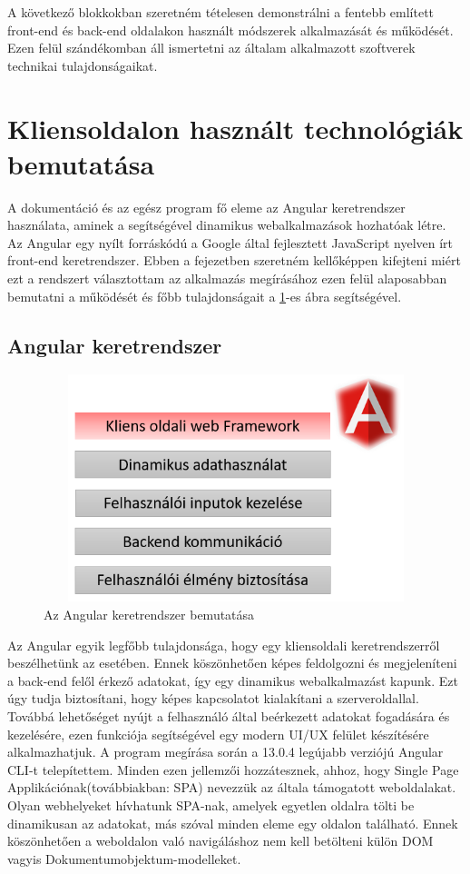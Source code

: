 \bigskip
A következő blokkokban szeretném tételesen demonstrálni a fentebb említett front-end és back-end oldalakon használt módszerek alkalmazását és működését. Ezen felül szándékomban áll ismertetni az általam alkalmazott szoftverek technikai tulajdonságaikat.

\section{Kliensoldalon használt technológiák bemutatása}
A dokumentáció és az egész program fő eleme az Angular keretrendszer használata, aminek a segítségével dinamikus webalkalmazások hozhatóak létre. Az Angular egy nyílt forráskódú a Google által fejlesztett JavaScript nyelven írt front-end keretrendszer. Ebben a fejezetben szeretném kellőképpen kifejteni miért ezt a rendszert választottam az alkalmazás megírásához ezen felül alaposabban bemutatni a működését és főbb tulajdonságait a \ref{fig.picture-2}-es ábra segítségével. 

\subsection{Angular keretrendszer}

\begin{figure}[H]
	\centering
	\includegraphics[width=1.0\textwidth,height=250px]{images/angular_bemutatas.png}
	\caption{Az Angular keretrendszer bemutatása}
	\label{fig.picture-2}
\end{figure}

 Az Angular egyik legfőbb tulajdonsága, hogy egy kliensoldali keretrendszerről beszélhetünk az esetében. Ennek köszönhetően képes feldolgozni és megjeleníteni a back-end felől érkező adatokat, így egy dinamikus webalkalmazást kapunk. Ezt úgy tudja biztosítani, hogy képes kapcsolatot kialakítani a szerveroldallal. Továbbá lehetőséget nyújt a felhasználó által beérkezett adatokat fogadására és kezelésére, ezen funkciója segítségével egy modern UI/UX felület készítésére alkalmazhatjuk. A program megírása során a 13.0.4 legújabb verziójú Angular CLI-t telepítettem. Minden ezen jellemzői hozzátesznek, ahhoz, hogy Single Page Applikációnak(továbbiakban: SPA) nevezzük az általa támogatott weboldalakat. Olyan webhelyeket hívhatunk SPA-nak, amelyek egyetlen oldalra tölti be dinamikusan az adatokat, más szóval minden eleme egy oldalon található. Ennek köszönhetően a weboldalon való navigáláshoz nem kell betölteni külön DOM vagyis Dokumentumobjektum-modelleket.

